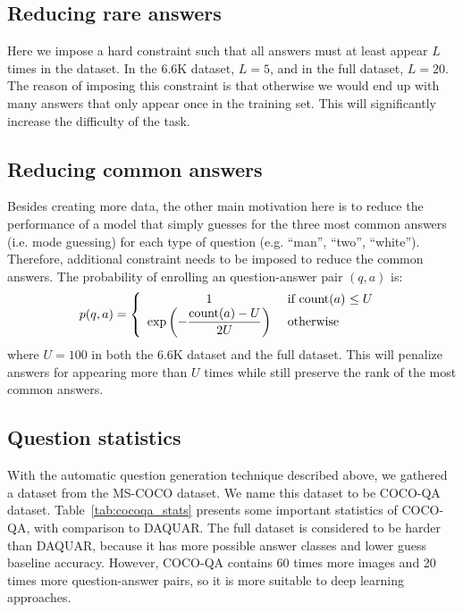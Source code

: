 \subsection{Reducing rare answers}
Here we impose a hard constraint such that all answers must at least appear $L$ times in the dataset. In the 6.6K dataset, $L=5$, and in the full dataset, $L=20$. The reason of imposing this constraint is that otherwise we would end up with many answers that only appear once in the training set. This will significantly increase the difficulty of the task.

\subsection{Reducing common answers}
Besides creating more data, the other main motivation here is to reduce the performance of a model that simply guesses for the three most common answers (i.e. mode guessing) for each type of question (e.g. ``man'', ``two'', ``white''). Therefore, additional constraint needs to be imposed to reduce the common answers. The probability of enrolling an question-answer pair $(q, a)$ is:
\begin{equation}
p(q, a) = \left\{ \begin{array}{cl}
1 &\mbox{ if \text{count}$(a)$ $\le U$ } \\
\exp\left(-\dfrac{\text{count}(a) - U}{2U}\right) &\mbox{ otherwise }
\end{array} \right.
\end{equation}
where $U=100$ in both the 6.6K dataset and the full dataset. This will penalize answers for appearing more than $U$ times while still preserve the rank of the most common answers.

\subsection{Question statistics}
With the automatic question generation technique described above, we gathered a dataset from the MS-COCO dataset. We name this dataset to be COCO-QA dataset. Table~\ref{tab:cocoqa_stats} presents some important statistics of COCO-QA, with comparison to DAQUAR. The full dataset is considered to be harder than DAQUAR, because it has more possible answer classes and lower guess baseline accuracy. However, COCO-QA contains 60 times more images and 20 times more question-answer pairs, so it is more suitable to deep learning approaches.

